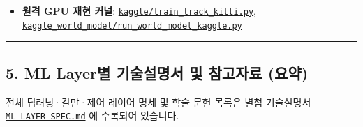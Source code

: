 \documentclass[10.5pt,a4paper]{article}
\begin{document}
\begin{itemize}[leftmargin=1.5em,itemsep=2pt]
\begin{itemize}[leftmargin=1.5em,itemsep=2pt]
\item Test 시퀀스 \texttt{0019} (8초 단계별 / 105.9초 전체): \href{https://github.com/Heisnotanimposter/Totalcare\_autonomous\_driving\_Yolov5/blob/main/results/v3\_bev\_fixed/world\_outputs/world\_model\_0019\_staged/world\_model\_demo\_0019.mp4}{\texttt{staged MP4}} / \href{https://github.com/Heisnotanimposter/Totalcare\_autonomous\_driving\_Yolov5/blob/main/results/v3\_bev\_fixed/world\_outputs/world\_model\_0019\_full/world\_model\_demo\_0019.mp4}{\texttt{full MP4}}
\end{itemize}
\item \textbf{원격 GPU 재현 커널}: \href{https://github.com/Heisnotanimposter/Totalcare\_autonomous\_driving\_Yolov5/blob/main/kaggle/train\_track\_kitti.py}{\texttt{kaggle/\allowbreak{}train\_\allowbreak{}track\_\allowbreak{}kitti.\allowbreak{}py}}, \href{https://github.com/Heisnotanimposter/Totalcare\_autonomous\_driving\_Yolov5/blob/main/kaggle\_world\_model/run\_world\_model\_kaggle.py}{\texttt{kaggle\_\allowbreak{}world\_\allowbreak{}model/\allowbreak{}run\_\allowbreak{}world\_\allowbreak{}model\_\allowbreak{}kaggle.\allowbreak{}py}}
\end{itemize}

\par\noindent\rule{\textwidth}{0.4pt}\par\medskip

\subsection{5. ML Layer별 기술설명서 및 참고자료 (요약)}

전체 딥러닝·칼만·제어 레이어 명세 및 학술 문헌 목록은 별첨 기술설명서 \href{https://github.com/Heisnotanimposter/Totalcare\_autonomous\_driving\_Yolov5/blob/main/ML\_LAYER\_SPEC.md}{\texttt{ML\_\allowbreak{}LAYER\_\allowbreak{}SPEC.\allowbreak{}md}} 에 수록되어 있습니다.
\end{document}
